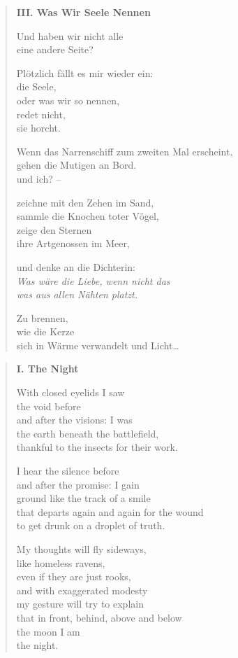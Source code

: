\begin{verse}
\clearpage

{\bfseries III. Was Wir Seele Nennen}

Und haben wir nicht alle\\
eine andere Seite?

Plötzlich fällt es mir wieder ein:\\
die Seele,\\
oder was wir so nennen,\\
redet nicht,\\
sie horcht.

Wenn das Narrenschiff zum zweiten Mal erscheint,\\
gehen die Mutigen an Bord.\\
und ich? --

zeichne mit den Zehen im Sand,\\
sammle die Knochen toter Vögel,\\
zeige den Sternen\\
ihre Artgenossen im Meer,

und denke an die Dichterin:\\
{\itshape Was wäre die Liebe, wenn nicht das\\
was aus allen Nähten platzt.}

Zu brennen,\\
wie die Kerze\\
sich in Wärme verwandelt und Licht\ldots
\end{verse}


\clearpage

\label{yucatan}


\begin{verse}

{\bfseries I. The Night}

With closed eyelids I saw\\
the void before\\
and after the visions: I was\\
the earth beneath the battlefield,\\
thankful to the insects for their work.

I hear the silence before\\
and after the promise: I gain\\
ground like the track of a smile\\
that departs again and again for the wound\\
to get drunk on a droplet of truth.

My thoughts will fly sideways,\\
like homeless ravens,\\
even if they are just rooks,\\
and with exaggerated modesty\\
my gesture will try to explain\\
that in front, behind, above and below\\
the moon I am\\
the night.
\end{verse}

